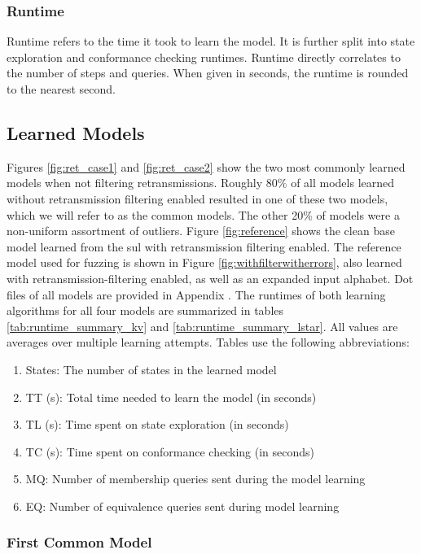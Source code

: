 \subsubsection*{Runtime}
Runtime refers to the time it took to learn the model. It is further split into state exploration and conformance checking runtimes. Runtime directly correlates to the number of steps and queries. When given in seconds, the runtime is rounded to the nearest second.


\subsection{Learned Models} \label{subsec:models}
Figures \ref{fig:ret_case1} and \ref{fig:ret_case2} show the two most commonly learned models when not filtering retransmissions. Roughly 80\% of all models learned without retransmission filtering enabled resulted in one of these two models, which we will refer to as the common models. The other 20\% of models were a non-uniform assortment of outliers. Figure \ref{fig:reference} shows the clean base model learned from the \ac{sul} with retransmission filtering enabled. The reference model used for fuzzing is shown in Figure \ref{fig:withfilterwitherrors}, also learned with retransmission-filtering enabled, as well as an expanded input alphabet. Dot files of all models are provided in Appendix . The runtimes of both learning algorithms for all four models are summarized in tables \ref{tab:runtime_summary_kv} and \ref{tab:runtime_summary_lstar}. All values are averages over multiple learning attempts. Tables use the following abbreviations:

\begin{enumerate}
	\item States: The number of states in the learned model
	\item TT (s): Total time needed to learn the model (in seconds)
	\item TL (s): Time spent on state exploration (in seconds)
	\item TC (s): Time spent on conformance checking (in seconds)
	\item MQ: Number of membership queries sent during the model learning
	\item EQ: Number of equivalence queries sent during model learning
\end{enumerate}
 

\subsubsection*{First Common Model}

